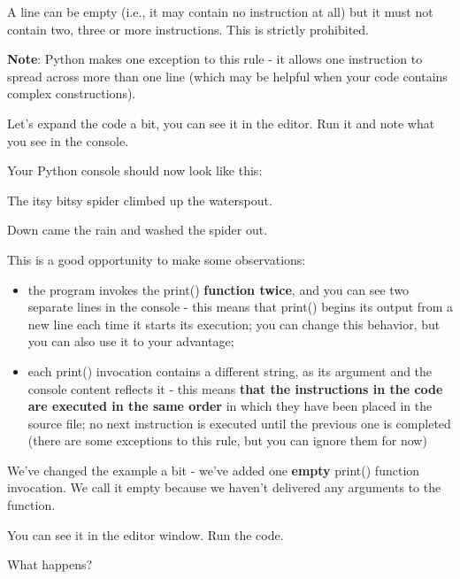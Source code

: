 \documentclass[a4paper,10pt]{article}
\begin{document}
A line can be empty (i.e., it may contain no instruction at all) but it must not contain two, three or more instructions. This is strictly prohibited.
\newline

\textbf{Note}: Python makes one exception to this rule - it allows one instruction to spread across more than one line (which may be helpful when your code contains complex constructions).
\newline

Let's expand the code a bit, you can see it in the editor. Run it and note what you see in the console.
\newline

Your Python console should now look like this:
\newline

{\selectfont The itsy bitsy spider climbed up the waterspout.

Down came the rain and washed the spider out.}
\newline

This is a good opportunity to make some observations:
\begin{itemize}
 \item the program invokes the {\selectfont print()} \textbf{function twice}, and you can see two separate lines in the console - this means that {\selectfont print()} begins its output from a new line each time it starts its execution; you can change this behavior, but you can also use it to your advantage;
 \item each {\selectfont print()} invocation contains a different string, as its argument and the console content reflects it - this means \textbf{that the instructions in the code are executed in the same order} in which they have been placed in the source file; no next instruction is executed until the previous one is completed (there are some exceptions to this rule, but you can ignore them for now)
\end{itemize}


We've changed the example a bit - we've added one \textbf{empty} {\selectfont print()} function invocation. We call it empty because we haven't delivered any arguments to the function.
\newline

You can see it in the editor window. Run the code.
\newline

What happens?
\newline
\end{document}
